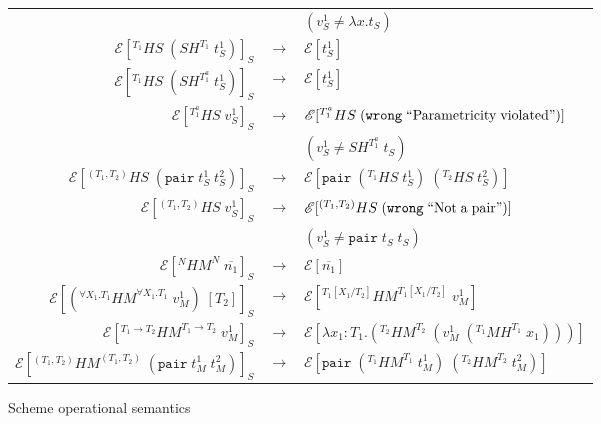\begin{figure}
\begin{center}
\begin{tabular}{rcl}
&& $(v_{S}^{1}\neq\lambda x.t_{S})$ \\
$\mathscr{E}[^{T_{1}}HS\;(SH^{T_{1}}\;t_{S}^{1})]_{S}$ & $\rightarrow$ & $\mathscr{E}[t_{S}^{1}]$ \\
$\mathscr{E}[^{T_{1}}HS\;(SH^{T^{a}_{1}}\;t_{S}^{1})]_{S}$ & $\rightarrow$ & $\mathscr{E}[t_{S}^{1}]$ \\
$\mathscr{E}[^{T^{a}_{1}}HS\;v_{S}^{1}]_{S}$ & $\rightarrow$ & $\mathscr{E}[^{T^{a}_{1}}HS\;(\mathtt{wrong}\;\mathrm{``Parametricity\;violated"})]$ \\
&& $(v_{S}^{1}\neq SH^{T^{a}_{1}}\;t_{S})$ \\
$\mathscr{E}[^{(T_{1},T_{2})}HS\;(\mathtt{pair}\;t_{S}^{1}\;t_{S}^{2})]_{S}$ & $\rightarrow$ & $\mathscr{E}[\mathtt{pair}\;(^{T_{1}}HS\;t_{S}^{1})\;(^{T_{2}}HS\;t_{S}^{2})]$ \\
$\mathscr{E}[^{(T_{1},T_{2})}HS\;v_{S}^{1}]_{S}$ & $\rightarrow$ & $\mathscr{E}[^{(T_{1},T_{2})}HS\;(\mathtt{wrong}\;\mathrm{``Not\;a\;pair"})]$ \\
&& $(v_{S}^{1}\neq\mathtt{pair}\;t_{S}\;t_{S})$ \\
$\mathscr{E}[^{N}HM^{N}\;\overline{n_{1}}]_{S}$ & $\rightarrow$ & $\mathscr{E}[\overline{n_{1}}]$ \\
$\mathscr{E}[(^{\forall X_{1}.T_{1}}HM^{\forall X_{1}.T_{1}}\;v_{M}^{1})\;[T_{2}]]_{S}$ & $\rightarrow$ & $\mathscr{E}[^{T_{1}[X_{1}/T_{2}]}HM^{T_{1}[X_{1}/T_{2}]}\;v_{M}^{1}]$ \\
$\mathscr{E}[^{T_{1}\rightarrow T_{2}}HM^{T_{1}\rightarrow T_{2}}\;v_{M}^{1}]_{S}$ & $\rightarrow$ & $\mathscr{E}[\lambda x_{1}:T_{1}.(^{T_{2}}HM^{T_{2}}\;(v_{M}^{1}\;(^{T_{1}}MH^{T_{1}}\;x_{1})))]$ \\
$\mathscr{E}[^{(T_{1},T_{2})}HM^{(T_{1},T_{2})}\;(\mathtt{pair}\;t_{M}^{1}\;t_{M}^{2})]_{S}$ & $\rightarrow$ & $\mathscr{E}[\mathtt{pair}\;(^{T_{1}}HM^{T_{1}}\;t_{M}^{1})\;(^{T_{2}}HM^{T_{2}}\;t_{M}^{2})]$ \\
\end{tabular}
\caption{Scheme operational semantics}
\label{fig:sos}
\end{center}
\end{figure}
